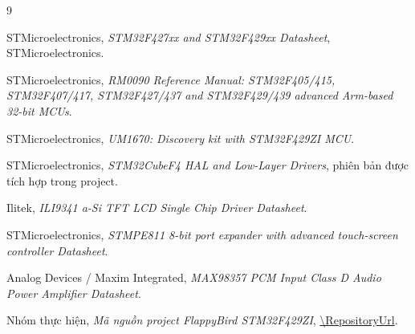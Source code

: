 \begin{thebibliography}{9}

STMicroelectronics,
\textit{STM32F427xx and STM32F429xx Datasheet},
STMicroelectronics.

STMicroelectronics,
\textit{RM0090 Reference Manual: STM32F405/415, STM32F407/417, STM32F427/437 and STM32F429/439 advanced Arm-based 32-bit MCUs}.

STMicroelectronics,
\textit{UM1670: Discovery kit with STM32F429ZI MCU}.

STMicroelectronics,
\textit{STM32CubeF4 HAL and Low-Layer Drivers}, phiên bản được tích hợp trong project.

Ilitek,
\textit{ILI9341 a-Si TFT LCD Single Chip Driver Datasheet}.

STMicroelectronics,
\textit{STMPE811 8-bit port expander with advanced touch-screen controller Datasheet}.

Analog Devices / Maxim Integrated,
\textit{MAX98357 PCM Input Class D Audio Power Amplifier Datasheet}.

Nhóm thực hiện,
\textit{Mã nguồn project FlappyBird STM32F429ZI},
\url{\RepositoryUrl}.

\end{thebibliography}
